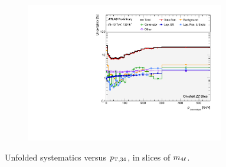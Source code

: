 \begin{figure}[hp]
    \begin{subfigure}{.49\textwidth}\centering\includegraphics[width = 0.95\textwidth]{Figures/m4l/Systematics/Unfolded/UnfoldedSys_pt34_vs_M4l_Stack_Paper3.pdf}\end{subfigure}
    \caption{Unfolded systematics versus $p_{\mathrm{T},34}$, in slices of $m_{4\ell}$.}
\end{figure}
